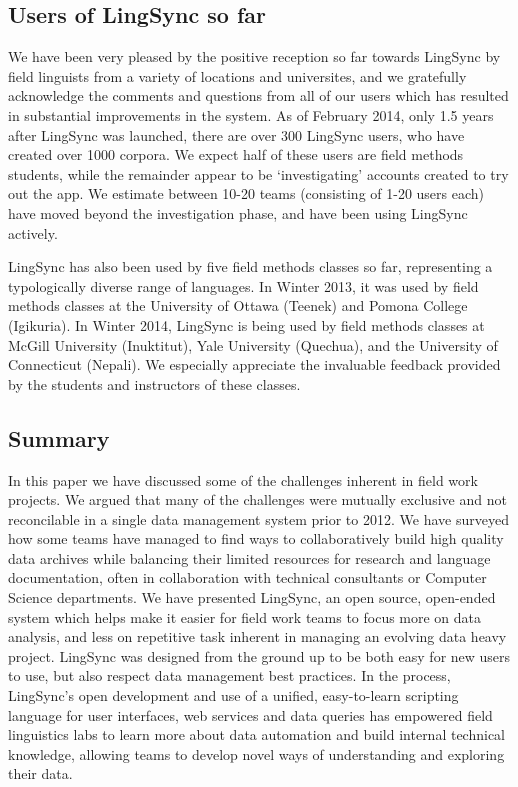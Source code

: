 \documentclass[letterpaper, 12pt, dvips]{mitwpl}
\begin{document}
\subsection{Users of LingSync so far}
\label{sec:use}

We have been very pleased by the positive reception so far towards LingSync by field linguists from a variety of locations and universites, and we gratefully acknowledge the comments and questions from all of our users which has resulted in substantial improvements in the system.
As of February 2014, only 1.5 years after LingSync was launched, there are over 300 LingSync users,
who have created over 1000 corpora.
We expect half of these users are field methods students, while the remainder appear to be `investigating' accounts created to try out the app.
We estimate between 10-20 teams (consisting of 1-20 users each) have moved beyond the investigation phase, and have been using LingSync actively.

LingSync has also been used by five field methods classes so far, representing a typologically diverse range of languages.  In Winter 2013, it was used by field methods classes 
at the University of Ottawa (Teenek) and Pomona College  (Igikuria). In Winter 2014, LingSync is being used by field methods classes
at McGill University (Inuktitut),
Yale University (Quechua),
and the University of Connecticut (Nepali).
We especially appreciate the invaluable feedback provided by the students and instructors of these classes.



\subsection{Summary}
\label{sec:summary} 

In this paper we have discussed some of the challenges inherent in field work projects. 
We argued that many of the challenges were mutually exclusive and not reconcilable in a single data management system prior to 2012. 
We have surveyed how some teams have managed to find ways to collaboratively build high quality data archives while balancing  their limited resources for research and language documentation, often in collaboration with technical consultants or Computer Science departments. 
We have presented LingSync, an open source, open-ended system which helps make it easier for field work teams to focus more on data analysis,  and less on 
 repetitive task inherent in managing an evolving data heavy project. 
LingSync was designed from the ground up to be both easy for new users to use, but also respect data management best practices. In the process, LingSync's open development and use of a unified, easy-to-learn scripting language for user interfaces, web services and data queries has empowered field linguistics labs to learn more about data automation and build internal technical knowledge, allowing teams to develop novel ways of understanding and exploring their data. %
\end{document}
